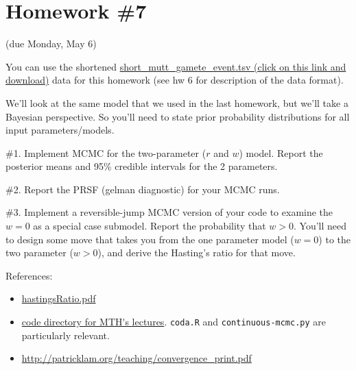 \documentclass[11pt]{article}
\newcommand{\href}[2]{\url{#2}}
\begin{document}
\section*{Homework \#7} (due Monday, May 6)

You can use the shortened \href{https://github.com/mtholder/likelihood-methods-course-2019/raw/master/homework/short_mutt_gamete_event.tsv}{short\_mutt\_gamete\_event.tsv (click on this link and download)} data for this
homework
(see hw 6 for description of the data format).


We'll look at the same model that we used in the last homework,
    but we'll take a Bayesian perspective.
So you'll need to state prior probability distributions for all
    input parameters/models.

\#1. Implement MCMC for the two-parameter ($r$ and $w$) model. Report the posterior means and 95\% credible intervals for the 2 parameters.


\#2. Report the PRSF (gelman diagnostic) for your MCMC runs.

\#3. Implement a reversible-jump MCMC version of your code to examine the $w=0$ as a special case submodel.
Report the probability that $w > 0$.
You'll need to design some move that takes you from the one parameter model
($w=0$) to the two parameter ($w>0$), and derive the Hasting's
ratio for that move.

References:
\begin{itemize}
 \item \href{http://phylo.bio.ku.edu/slides/hastingsRatio.pdf}{hastingsRatio.pdf}
\item \href{https://github.com/mtholder/likelihood-methods-course-2019/tree/master/code}{code directory for MTH's lectures}. {\tt coda.R} and
{\tt continuous-mcmc.py} are particularly relevant.
\item \url{http://patricklam.org/teaching/convergence_print.pdf}
\end{itemize}
\end{document}
